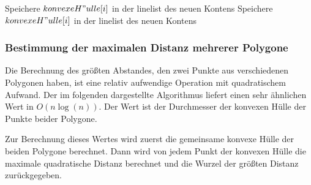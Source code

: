 \begin{algorithm}[!ht]
{{        	
{
			Speichere $konvexeH"ulle[i]$ in der linelist des neuen Kontens\;
}
{
			Speichere $konvexeH"ulle[i]$ in der linelist des neuen Kontens\;
}
}
%         
{
%             
}
}
 \end{algorithm}

\clearpage
\subsubsection{Bestimmung der maximalen Distanz mehrerer Polygone}\label{maxDist}
\label{gmD}
Die Berechnung des größten Abstandes, den zwei Punkte aus verschiedenen Polygonen haben, ist eine relativ aufwendige Operation mit quadratischem Aufwand. Der im folgenden dargestellte Algorithmus liefert einen sehr ähnlichen Wert in $O(n\log(n))$. Der Wert ist der Durchmesser der konvexen Hülle der Punkte beider Polygone. 

Zur Berechnung dieses Wertes wird zuerst die gemeinsame konvexe Hülle der beiden Polygone berechnet. Dann wird von jedem Punkt der konvexen Hülle die maximale quadratische Distanz berechnet und die Wurzel der größten Distanz zurückgegeben.

